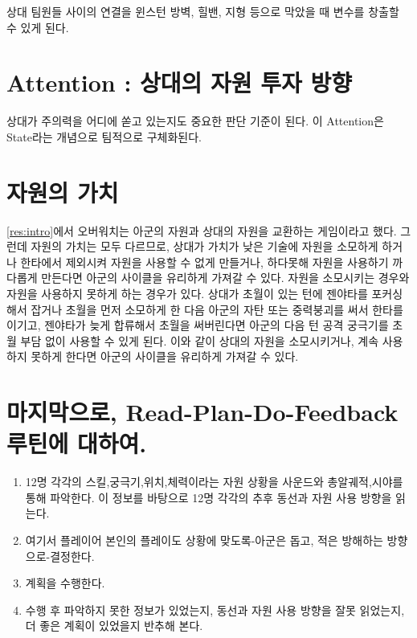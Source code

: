상대 팀원들 사이의 연결을 윈스턴 방벽, 힐밴, 지형 등으로 막았을 때 변수를 창출할 수 있게 된다.

\section{Attention : 상대의 자원 투자 방향}
상대가 주의력을 어디에 쏟고 있는지도 중요한 판단 기준이 된다.
이 Attention은 State라는 개념으로 팀적으로 구체화된다.

\section{자원의 가치}
\autoref{res:intro}에서 오버워치는 아군의 자원과 상대의 자원을 교환하는 게임이라고 했다. 그런데 자원의 가치는 모두 다르므로, 상대가 가치가 낮은 기술에 자원을 소모하게 하거나 한타에서 제외시켜 자원을 사용할 수 없게 만들거나, 하다못해 자원을 사용하기 까다롭게 만든다면 아군의 사이클을 유리하게 가져갈 수 있다.
자원을 소모시키는 경우와 자원을 사용하지 못하게 하는 경우가 있다. 상대가 초월이 있는 턴에 젠야타를 포커싱해서 잡거나 초월을 먼저 소모하게 한 다음 아군의 자탄 또는 중력붕괴를 써서 한타를 이기고, 젠야타가 늦게 합류해서 초월을 써버린다면 아군의 다음 턴 공격 궁극기를 초월 부담 없이 사용할 수 있게 된다.
이와 같이 상대의 자원을 소모시키거나, 계속 사용하지 못하게 한다면 아군의 사이클을 유리하게 가져갈 수 있다.

\section{마지막으로, Read-Plan-Do-Feedback 루틴에 대하여.}
\begin{enumerate}
    \item 12명 각각의 스킬,궁극기,위치,체력이라는 자원 상황을 사운드와 총알궤적,시야를 통해 파악한다. 이 정보를 바탕으로 12명 각각의 추후 동선과 자원 사용 방향을 읽는다.
    \item  여기서 플레이어 본인의 플레이도 상황에 맞도록-아군은 돕고, 적은 방해하는 방향으로-결정한다.
    \item 계획을 수행한다.
    \item 수행 후 파악하지 못한 정보가 있었는지, 동선과 자원 사용 방향을 잘못 읽었는지, 더 좋은 계획이 있었을지 반추해 본다.
\end{enumerate}
